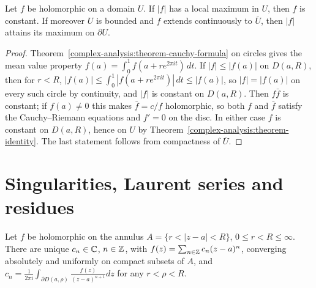 \begin{theorem}\label{complex-analysis:theorem-maximum-modulus}
Let $f$ be holomorphic on a domain $U$. If $|f|$ has a local maximum in $U$, then $f$ is constant. If moreover $U$ is bounded and $f$ extends continuously to $\overline{U}$, then $|f|$ attains its maximum on
$\partial U$.
\end{theorem}

\begin{proof}
Theorem~\ref{complex-analysis:theorem-cauchy-formula} on circles gives the mean value property $f(a) = \int_0^1f(a + re^{2\pi it})\,dt$. If $|f| \leq |f(a)|$ on $D(a, R)$, then for $r < R$,
$|f(a)| \leq \int_0^1|f(a + re^{2\pi it})|\,dt \leq |f(a)|$, so $|f| = |f(a)|$ on every such circle by continuity, and $|f|$ is constant on $D(a, R)$. Then $f\bar f$ is constant; if $f(a) \neq 0$ this makes
$\bar f = c/f$ holomorphic, so both $f$ and $\bar f$ satisfy the Cauchy--Riemann equations and $f' = 0$ on the disc. In either case $f$ is constant on $D(a, R)$, hence on $U$ by
Theorem~\ref{complex-analysis:theorem-identity}. The last statement follows from compactness of $\overline{U}$.
\end{proof}

\section{Singularities, Laurent series and residues}\label{complex-analysis:section-residues}

\begin{theorem}\label{complex-analysis:theorem-laurent}
Let $f$ be holomorphic on the annulus $A = \{r < |z - a| < R\}$, $0 \leq r < R \leq \infty$. There are unique $c_n \in \mathbb{C}$, $n \in \mathbb{Z}$, with $f(z) = \sum_{n \in \mathbb{Z}}c_n(z - a)^n$, converging absolutely and
uniformly on compact subsets of $A$, and $c_n = \frac{1}{2\pi i}\int_{\partial D(a, \rho)}\frac{f(z)}{(z - a)^{n+1}}dz$ for any $r < \rho < R$.
\end{theorem}


